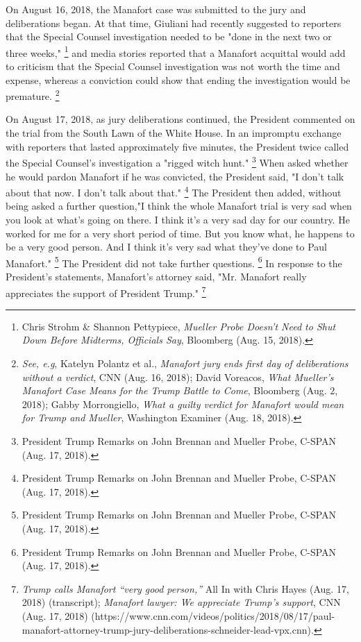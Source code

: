 On August 16, 2018, the Manafort case was submitted to the jury and deliberations began.
At that time, Giuliani had recently suggested to reporters that the Special Counsel investigation needed to be "done in the next two or three weeks,"%
\footnote{Chris Strohm \& Shannon Pettypiece, \textit{Mueller Probe Doesn’t Need to Shut Down Before Midterms, Officials Say}, Bloomberg (Aug. 15, 2018).}
and media stories reported that a Manafort acquittal would add to criticism that the Special Counsel investigation was not worth the time and expense, whereas a conviction could show that ending the investigation would be premature.%
\footnote{\textit{See, e.g}, Katelyn Polantz et al., \textit{Manafort jury ends first day of deliberations without a verdict}, CNN (Aug. 16, 2018);
David Voreacos, \textit{What Mueller’s Manafort Case Means for the Trump Battle to Come}, Bloomberg (Aug. 2, 2018);
Gabby Morrongiello, \textit{What a guilty verdict for Manafort would mean for Trump and Mueller}, Washington Examiner (Aug. 18, 2018).}

On August 17, 2018, as jury deliberations continued, the President commented on the trial from the South Lawn of the White House.
In an impromptu exchange with reporters that lasted approximately five minutes, the President twice called the Special Counsel's investigation a "rigged witch hunt."%
\footnote{President Trump Remarks on John Brennan and Mueller Probe, C-SPAN (Aug. 17, 2018).}
When asked whether he would pardon Manafort if he was convicted, the President said, "I don't talk about that now.
I don't talk about that."%
\footnote{President Trump Remarks on John Brennan and Mueller Probe, C-SPAN (Aug. 17, 2018).}
The President then added, without being asked a further question,"I think the whole Manafort trial is very sad when you look at what's going on there.
I think it's a very sad day for our country.
He worked for me for a very short period of time.
But you know what, he happens to be a very good person.
And I think it's very sad what they've done to Paul Manafort."%
\footnote{President Trump Remarks on John Brennan and Mueller Probe, C-SPAN (Aug. 17, 2018).}
The President did not take further questions.%
\footnote{President Trump Remarks on John Brennan and Mueller Probe, C-SPAN (Aug. 17, 2018).}
In response to the President's statements, Manafort's attorney said, "Mr. Manafort really appreciates the support of President Trump."%
\footnote{\textit{Trump calls Manafort “very good person,”} All In with Chris Hayes (Aug. 17, 2018) (transcript);
\textit{Manafort lawyer: We appreciate Trump’s support}, CNN (Aug. 17, 2018) (https://www.cnn.com/videos/politics/2018/08/17/paul-manafort-attorney-trump-jury-deliberations-schneider-lead-vpx.cnn).}

